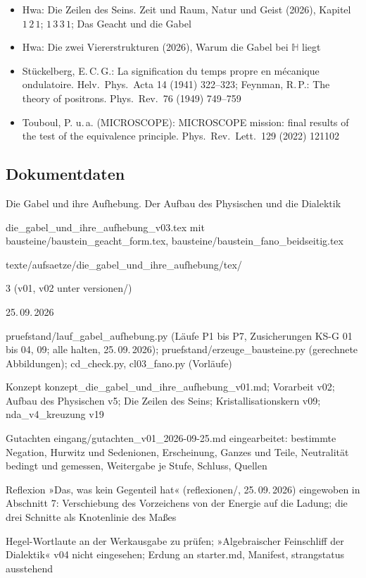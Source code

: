 \documentclass[11pt,a4paper]{article}
\newcommand{\HH}{\mathbb H}
\begin{document}
\begin{itemize}[leftmargin=1.2em,itemsep=0pt]
\item Hwa: Die Zeilen des Seins. Zeit und Raum, Natur und Geist (2026), Kapitel $1\,2\,1$; $1\,3\,3\,1$; Das Geacht und die Gabel
\item Hwa: Die zwei Viererstrukturen (2026), Warum die Gabel bei $\HH$ liegt
\item Stückelberg, E.\,C.\,G.: La signification du temps propre en mécanique ondulatoire. Helv.\ Phys.\ Acta 14 (1941) 322--323; Feynman, R.\,P.: The theory of positrons. Phys.\ Rev.\ 76 (1949) 749--759
\item Touboul, P. u.\,a. (MICROSCOPE): MICROSCOPE mission: final results of the test of the equivalence principle. Phys.\ Rev.\ Lett.\ 129 (2022) 121102
\end{itemize}

\vfill
\sloppy
\subsection*{Dokumentdaten}
\begin{description}[itemsep=0pt,font=\normalfont\bfseries]
\item[Titel:] Die Gabel und ihre Aufhebung. Der Aufbau des Physischen und die Dialektik
\item[Datei:] die\_gabel\_und\_ihre\_aufhebung\_v03.tex mit bausteine/baustein\_geacht\_form.tex, bausteine/baustein\_fano\_beidseitig.tex
\item[Ablage:] texte/aufsaetze/die\_gabel\_und\_ihre\_aufhebung/tex/
\item[Version:] 3 (v01, v02 unter versionen/)
\item[Datum:] 25.\,09.\,2026
\item[Prüfstand:] pruefstand/lauf\_gabel\_aufhebung.py (Läufe P1 bis P7, Zusicherungen KS-G 01 bis 04, 09; alle halten, 25.\,09.\,2026); pruefstand/erzeuge\_bausteine.py (gerechnete Abbildungen); cd\_check.py, cl03\_fano.py (Vorläufe)
\item[Grundlage:] Konzept konzept\_die\_gabel\_und\_ihre\_aufhebung\_v01.md; Vorarbeit v02; Aufbau des Physischen v5; Die Zeilen des Seins; Kristallisationskern v09; nda\_v4\_kreuzung v19
\item[Änderung v2:] Gutachten eingang/gutachten\_v01\_2026-09-25.md eingearbeitet: bestimmte Negation, Hurwitz und Sedenionen, Erscheinung, Ganzes und Teile, Neutralität bedingt und gemessen, Weitergabe je Stufe, Schluss, Quellen
\item[Änderung v3:] Reflexion »Das, was kein Gegenteil hat« (reflexionen/, 25.\,09.\,2026) eingewoben in Abschnitt 7: Verschiebung des Vorzeichens von der Energie auf die Ladung; die drei Schnitte als Knotenlinie des Maßes
\item[Offen:] Hegel-Wortlaute an der Werkausgabe zu prüfen; »Algebraischer Feinschliff der Dialektik« v04 nicht eingesehen; Erdung an starter.md, Manifest, strangstatus ausstehend
\end{description}
\end{document}

